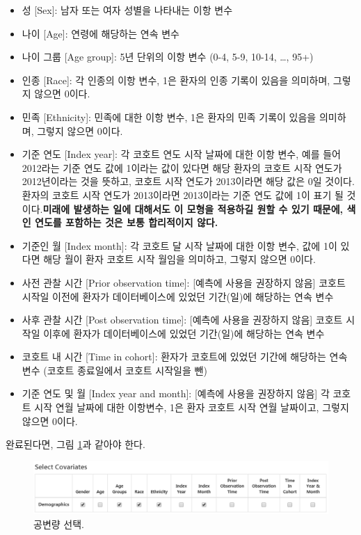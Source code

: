 \documentclass[10.5pt]{book}
\providecommand{\tightlist}{%
  \setlength{\itemsep}{0pt}\setlength{\parskip}{0pt}}
\theoremstyle{definition}
\theoremstyle{definition}
\theoremstyle{definition}
\theoremstyle{remark}
\begin{document}
\begin{itemize}
\tightlist
\item
  성 {[}Sex{]}: 남자 또는 여자 성별을 나타내는 이항 변수
\item
  나이 {[}Age{]}: 연령에 해당하는 연속 변수
\item
  나이 그룹 {[}Age group{]}: 5년 단위의 이항 변수 (0-4, 5-9, 10-14,
  \ldots{}, 95+)
\item
  인종 {[}Race{]}: 각 인종의 이항 변수, 1은 환자의 인종 기록이 있음을
  의미하며, 그렇지 않으면 0이다.
\item
  민족 {[}Ethnicity{]}: 민족에 대한 이항 변수, 1은 환자의 민족 기록이
  있음을 의미하며, 그렇지 않으면 0이다.
\item
  기준 연도 {[}Index year{]}: 각 코호트 연도 시작 날짜에 대한 이항 변수,
  예를 들어 2012라는 기준 연도 값에 1이라는 값이 있다면 해당 환자의
  코호트 시작 연도가 2012년이라는 것을 뜻하고, 코호트 시작 연도가
  2013이라면 해당 값은 0일 것이다. 환자의 코호트 시작 연도가 2013이라면
  2013이라는 기준 연도 값에 1이 표기 될 것이다.\textbf{미래에 발생하는
  일에 대해서도 이 모형을 적용하길 원할 수 있기 때문에, 색인 연도를
  포함하는 것은 보통 합리적이지 않다.}
\item
  기준인 월 {[}Index month{]}: 각 코호트 달 시작 날짜에 대한 이항 변수,
  값에 1이 있다면 해당 월이 환자 코호트 시작 월임을 의미하고, 그렇지
  않으면 0이다.
\item
  사전 관찰 시간 {[}Prior observation time{]}: {[}예측에 사용을 권장하지
  않음{]} 코호트 시작일 이전에 환자가 데이터베이스에 있었던 기간(일)에
  해당하는 연속 변수
\item
  사후 관찰 시간 {[}Post observation time{]}: {[}예측에 사용을 권장하지
  않음{]} 코호트 시작일 이후에 환자가 데이터베이스에 있었던 기간(일)에
  해당하는 연속 변수
\item
  코호트 내 시간 {[}Time in cohort{]}: 환자가 코호트에 있었던 기간에
  해당하는 연속 변수 (코호트 종료일에서 코호트 시작일을 뺀)
\item
  기준 연도 및 월 {[}Index year and month{]}: {[}예측에 사용을 권장하지
  않음{]} 각 코호트 시작 연월 날짜에 대한 이항변수, 1은 환자 코호트 시작
  연월 날짜이고, 그렇지 않으면 0이다.
\end{itemize}

완료된다면, 그림 \ref{fig:covariateSettings2}과 같아야 한다.

\begin{figure}

{\centering \includegraphics[width=1\linewidth]{images/PatientLevelPrediction/covariateSettings2} 

}

\caption{공변량 선택.}\label{fig:covariateSettings2}
\end{figure}
\end{document}
